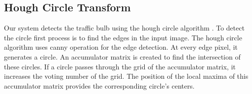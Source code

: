 \subsection{Hough Circle Transform}
Our system detects the traffic bulb using the hough circle algorithm \cite{houghcir_alg}.
To detect the circle first process is to find the edges in the input image.
The hough circle algorithm uses canny operation for the edge detection.
At every edge pixel, it generates a circle.
An accumulator matrix is created to find the intersection of these circles.
If a circle passes through the grid of the accumulator matrix, it increases the voting number of the grid.
The position of the local maxima of this accumulator matrix provides the corresponding circle's centers.








